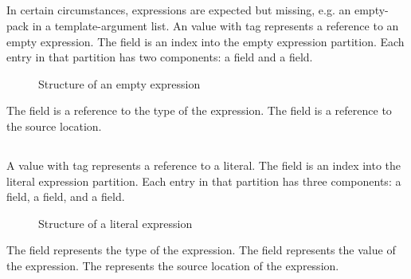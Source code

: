 
\subsection{}
\label{sec:ifc:ExprSort:Empty}

In certain circumstances, expressions are expected but missing, e.g. an empty-pack in a template-argument list.
An  value with tag  represents a reference to an empty expression.
The  field is an index into the empty expression partition.
Each entry in that partition has two components: a  field and a  field.
%
\begin{figure}[H]
	\centering
	\caption{Structure of an empty expression}
	\label{fig:ifc-empty-expression-structure}
\end{figure}
%
The  field is a reference to the type of the expression.
The  field is a reference to the source location.


\subsection{}
\label{sec:ifc:ExprSort:Literal}

A  value with tag  represents a reference to a literal.
The  field is an index into the literal expression partition.
Each entry in that partition has three components: a  field, a  field, and a  field.
%
\begin{figure}[H]
	\centering
	\caption{Structure of a literal expression}
	\label{fig:ifc-literal-expr-structure}
\end{figure}
%
The  field represents the type of the expression.
The  field represents the value of the expression.
The  represents the source location of the expression.

